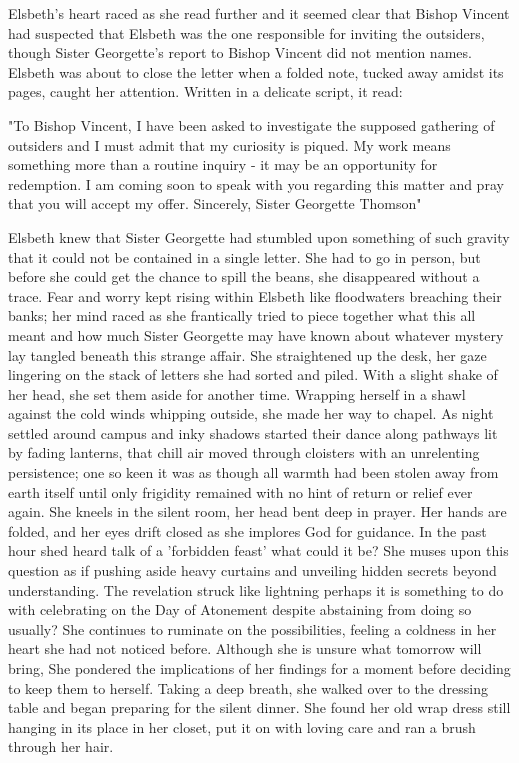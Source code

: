 \documentclass[11pt]{article}
\begin{document}
Elsbeth's heart raced as she read further and it seemed clear that Bishop Vincent had suspected that Elsbeth was the one responsible for inviting the outsiders, though Sister Georgette's report to Bishop Vincent did not mention names. Elsbeth was about to close the letter when a folded note, tucked away amidst its pages, caught her attention. Written in a delicate script, it read:

"To Bishop Vincent,
I have been asked to investigate the supposed gathering of outsiders and I must admit that my curiosity is piqued. My work means something more than a routine inquiry - it may be an opportunity for redemption. I am coming soon to speak with you regarding this matter and pray that you will accept my offer.
Sincerely,
Sister Georgette Thomson"

Elsbeth knew that Sister Georgette had stumbled upon something of such gravity that it could not be contained in a single letter. She had to go in person, but before she could get the chance to spill the beans, she disappeared without a trace. Fear and worry kept rising within Elsbeth like floodwaters breaching their banks; her mind raced as she frantically tried to piece together what this all meant and how much Sister Georgette may have known about whatever mystery lay tangled beneath this strange affair. She straightened up the desk, her gaze lingering on the stack of letters she had sorted and piled. With a slight shake of her head, she set them aside for another time. Wrapping herself in a shawl against the cold winds whipping outside, she made her way to chapel. As night settled around campus and inky shadows started their dance along pathways lit by fading lanterns, that chill air moved through cloisters with an unrelenting persistence; one so keen it was as though all warmth had been stolen away from earth itself until only frigidity remained with no hint of return or relief ever again.
She kneels in the silent room, her head bent deep in prayer. Her hands are folded, and her eyes drift closed as she implores God for guidance. In the past hour shed heard talk of a 'forbidden feast' what could it be? She muses upon this question as if pushing aside heavy curtains and unveiling hidden secrets beyond understanding. The revelation struck like lightning perhaps it is something to do with celebrating on the Day of Atonement despite abstaining from doing so usually?
She continues to ruminate on the possibilities, feeling a coldness in her heart she had not noticed before. Although she is unsure what tomorrow will bring, She pondered the implications of her findings for a moment before deciding to keep them to herself. Taking a deep breath, she walked over to the dressing table and began preparing for the silent dinner. She found her old wrap dress still hanging in its place in her closet, put it on with loving care and ran a brush through her hair.
\end{document}
